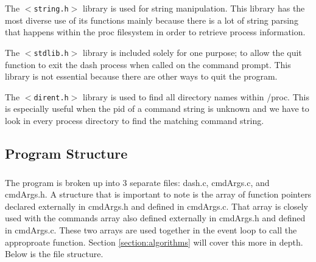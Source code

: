\documentclass[10pt]{article}
\begin{document}
The \texttt{$<$string.h$>$} library is used for string manipulation. This library has the most diverse use of its functions mainly because there is a lot of string parsing that happens within the proc filesystem in order to retrieve process information.

The \texttt{$<$stdlib.h$>$} library is included solely for one purpose; to allow the quit function to exit the dash process when called on the command prompt. This library is not essential because there are other ways to quit the program.

The \texttt{$<$dirent.h$>$} library is used to find all directory names within /proc. This is especially useful when the pid of a command string is unknown and we have to look in every process directory to find the matching command string.

\subsection{Program Structure}
\label{subsection:structure}
\subparagraph{}
The program is broken up into 3 separate files: dash.c, cmdArgs.c, and cmdArgs.h. A structure that is important to note is the array of function pointers declared externally in cmdArgs.h and defined in cmdArgs.c. That array is closely used with the commands array also defined externally in cmdArgs.h and defined in cmdArgs.c. These two arrays are used together in the event loop to call the approproate function. Section \ref{section:algorithms} will cover this more in depth. Below is the file structure.\\
\end{document}
